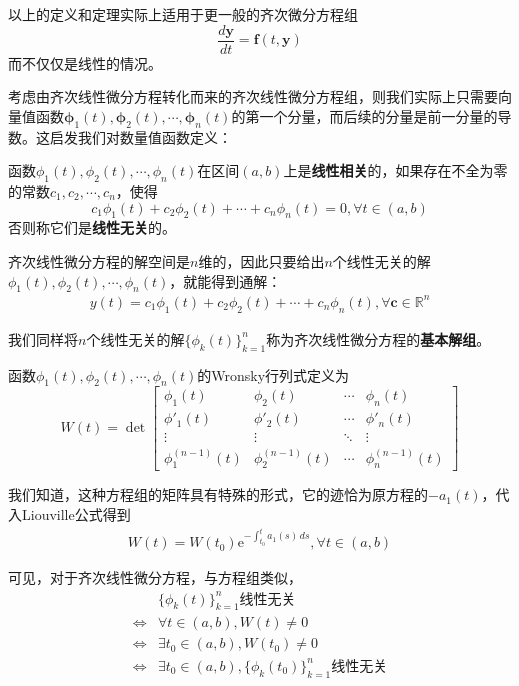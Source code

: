\documentclass{ctexbook}
\begin{document}
以上的定义和定理实际上适用于更一般的齐次微分方程组
$$\frac{d\mathbf{y}}{dt}=\mathbf{f}(t,\mathbf{y})$$
而不仅仅是线性的情况。

考虑由齐次线性微分方程转化而来的齐次线性微分方程组，则我们实际上只需要向量值函数$\boldsymbol{\phi}_1(t),\boldsymbol{\phi}_2(t),\cdots,\boldsymbol{\phi}_n(t)$的第一个分量，而后续的分量是前一分量的导数。这启发我们对数量值函数定义：
\begin{definition}
    函数$\phi_1(t),\phi_2(t),\cdots,\phi_n(t)$在区间$(a,b)$上是\textbf{线性相关}的，如果存在不全为零的常数$c_1,c_2,\cdots,c_n$，使得
    \[c_1\phi_1(t)+c_2\phi_2(t)+\cdots+c_n\phi_n(t)=0,\forall t\in(a,b)\]
    否则称它们是\textbf{线性无关}的。
\end{definition}

齐次线性微分方程的解空间是$n$维的，因此只要给出$n$个线性无关的解$\phi_1(t),\phi_2(t),\cdots,\phi_n(t)$，就能得到通解：\begin{align*}
    y(t)=c_1\phi_1(t)+c_2\phi_2(t)+\cdots+c_n\phi_n(t),\forall \mathbf{c}\in\mathbb{R}^n
\end{align*}

我们同样将$n$个线性无关的解$\{\phi_k(t)\}_{k=1}^n$称为齐次线性微分方程的\textbf{基本解组}。

\begin{definition}[Wronsky行列式]
    函数$\phi_1(t),\phi_2(t),\cdots,\phi_n(t)$的Wronsky行列式定义为
    \[W(t)=\det\begin{bmatrix}
    \phi_1(t) & \phi_2(t) & \cdots & \phi_n(t)\\
    \phi'_1(t) & \phi'_2(t) & \cdots & \phi'_n(t)\\
    \vdots & \vdots & \ddots & \vdots\\
    \phi_1^{(n-1)}(t) & \phi_2^{(n-1)}(t) & \cdots & \phi_n^{(n-1)}(t)
    \end{bmatrix}\]
\end{definition}

我们知道，这种方程组的矩阵具有特殊的形式，它的迹恰为原方程的$-a_1(t)$，代入Liouville公式得到\begin{align*}
    W(t)=W(t_0)\mathrm{e}^{-\int_{t_0}^t a_1(s)\,ds},\forall t\in(a,b)
\end{align*}

可见，对于齐次线性微分方程，与方程组类似，\begin{align*}
    &\{\phi_k(t)\}_{k=1}^n\text{线性无关}\\
    \iff& \forall t\in(a,b),W(t)\neq 0\\
    \iff& \exists t_0\in(a,b),W(t_0)\neq 0\\
    \iff& \exists t_0\in(a,b),\{\phi_k(t_0)\}_{k=1}^n\text{线性无关}
\end{align*}
\end{document}

